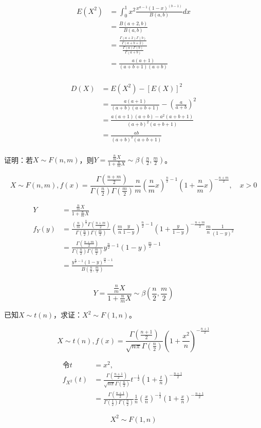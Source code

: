   \[
    \begin{split}
      E(X^2) &= \int_0^1 x^2 \frac{x^{a-1} (1-x)^(b-1)}{B(a, b)}dx\\
      &= \frac{B(a+2, b)}{B(a, b)}\\
      &= \frac{\frac{\Gamma (a+2) \Gamma (b)}{\Gamma (a+b+2)}}{\frac{\Gamma (a) \Gamma (b)}{\Gamma (a+b)}}\\
      &= \frac{a(a+1)}{(a+b+1)(a+b)}\\
    \end{split}
  \]

  \[
    \begin{split}
      D(X) &= E(X^2) - [E(X)]^2\\
      &= \frac{a(a+1)}{(a+b)(a+b+1)} - (\frac{a}{a+b})^2\\
      &= \frac{a(a+1)(a+b) - a^2(a+b+1)}{(a+b)^2 (a+b+1)}\\
      &= \frac{ab}{(a+b)^2(a+b+1)}\\
    \end{split}
  \]


   证明：若$X \sim F(n, m)$，则$Y = \frac{\frac{n}{m} X}{1+\frac{n}{m} X} \sim \beta (\frac{n}{2}, \frac{m}{2})$。

  \xsv
  \[
    X \sim F(n, m),
    f(x) = \frac{\Gamma (\frac{n+m}{2})}{\Gamma (\frac{n}{2}) \Gamma (\frac{m}{2})} \frac{n}{m} (\frac{n}{m} x)^{\frac{n}{2} - 1} (1+\frac{n}{m} x)^{-\frac{n+m}{2}}, \quad x>0
  \]

  \[
    \begin{split}
      Y &= \frac{\frac{n}{m} X}{1+\frac{n}{m} X}\\
      f_Y (y) &= \frac{(\frac{n}{m})^{\frac{n}{2}} \Gamma (\frac{n+m}{2})}{\Gamma (\frac{n}{2}) \Gamma (\frac{m}{2})} (\frac{m}{n} \frac{y}{1-y})^{\frac{n}{2} - 1} (1+\frac{y}{1-y})^{-\frac{n+m}{2}} \frac{m}{n} \frac{1}{(1-y)^2}\\
      &= \frac{\Gamma (\frac{n+m}{2})}{\Gamma (\frac{n}{2}) \Gamma (\frac{m}{2})} y^{\frac{n}{2} - 1} (1-y)^{\frac{m}{2} - 1}\\
      &= \frac{y^{\frac{n}{2} - 1} (1-y)^{\frac{m}{2} - 1}}{B(\frac{n}{2}, \frac{m}{2})}\\
    \end{split}
  \]

  $$Y = \frac{\frac{n}{m} X}{1+\frac{n}{m} X} \sim \beta (\frac{n}{2}, \frac{m}{2})$$

   已知$X \sim t(n)$，求证：$X^2 \sim F(1, n)$。

  \xsv
  \[
    X \sim t(n),
    f(x) = \frac{\Gamma (\frac{n+1}{2})}{\sqrt{n\pi} \Gamma (\frac{n}{2})} (1+\frac{x^2}{n})^{-\frac{n+1}{2}}
  \]

  \[
    \begin{split}
    \text{令} t&=x^2,\\
    f_{X^2} (t) &= \frac{\Gamma (\frac{n+1}{2})}{\sqrt{n\pi} \Gamma (\frac{n}{2})} t^{-\frac{1}{2}} (1+\frac{t}{n})^{-\frac{n+1}{2}}\\
    &= \frac{\Gamma (\frac{n+1}{2})}{\Gamma (\frac{1}{2}) \Gamma (\frac{n}{2})} \frac{1}{n} (\frac{x}{n})^{-\frac{1}{2}} (1+\frac{x}{n})^{-\frac{n+1}{2}}
  \end{split}
  \]
  
  $$X^2 \sim F(1, n)$$

